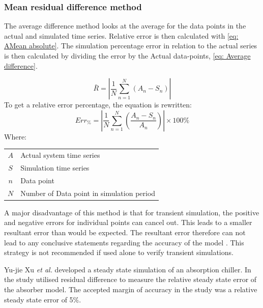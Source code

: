  		\subsubsection{Mean residual difference method}
 			The average difference method looks at the average for the data points in the actual and simulated time series. Relative error is then calculated with \cref{eq: AMean absolute}. The simulation percentage error in relation to the actual series is then calculated by dividing the error by the Actual data-points, \cref{eq: Average difference}.
 			
 			\begin{equation}
 			\label{eq: AMean absolute}
 			\bar{R} = \left| \dfrac{1}{N} \sum_{n=1}^{N}{ \left( A_{n} - S_{n}\right)} \right|
 			\end{equation}
To get a relative error percentage, the equation is rewritten:	
 			\begin{equation}
 				\label{eq: Average difference}
 				Err_{\%} = \left| \dfrac{1}{N} \sum_{n=1}^{N}{ \left(\dfrac{ A_{n} - S_{n}}{A_n}\right)} \right| \times 100 \%
 			\end{equation}
 			Where: \par 
 				\begin{table}[h!]
 					\centering
 					\begin{tabular}{cl}
 						$A$ & Actual system time series \\
 						$S$ & Simulation time series \\
 						$n$ & Data point \\
 						$N$ & Number of Data point in simulation period \\
 					\end{tabular} 
 				\end{table}	
 			A major disadvantage of this method is that for transient simulation, the positive and negative errors for individual points can cancel out. This leads to a smaller resultant error than would be expected. The resultant error therefore can not lead to any conclusive statements regarding the accuracy of the model \cite{sarin2010comparing}. This strategy is not recommended if used alone to verify transient simulations. 
 			\par 
 						
 			Yu-jie Xu \textit{et al.} \cite{xu2016modeling} developed a steady state simulation of an absorption chiller. In the study \cite{xu2016modeling} utilised residual difference to measure the relative steady state error of the absorber model. The accepted margin of accuracy in the study was a relative steady state error of 5\%. 
 			
